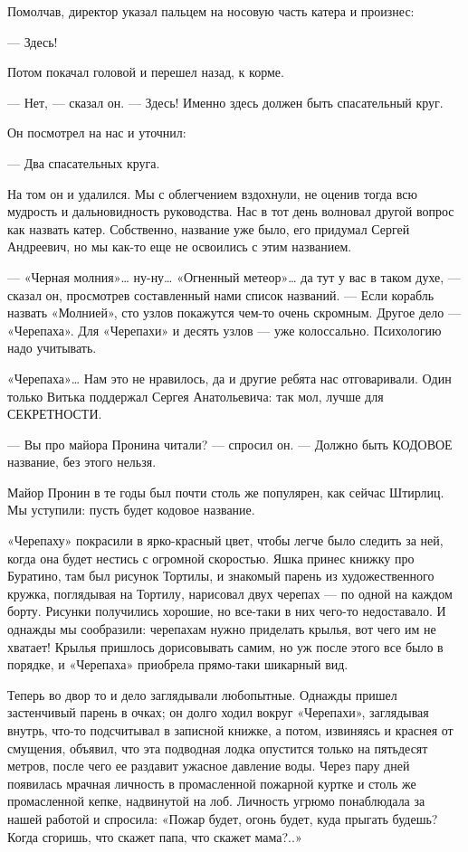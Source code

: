 Помолчав, директор указал пальцем на носовую часть катера и произнес:

— Здесь!

Потом покачал головой и перешел назад, к корме.

— Нет, — сказал он. — Здесь! Именно здесь должен быть спасательный круг.

Он посмотрел на нас и уточнил:

— Два спасательных круга.

На том он  и удалился.  Мы с облегчением  вздохнули, не  оценив тогда  всю
мудрость и  дальновидность руководства.  Нас в  тот день  волновал  другой
вопрос как  назвать катер.  Собственно, название  уже было,  его  придумал
Сергей Андреевич, но мы как-то еще не освоились с этим названием.

— «Черная молния»… ну-ну… «Огненный метеор»… да тут у вас в таком духе,  —
сказал он, просмотрев  составленный нами список  названий. — Если  корабль
назвать «Молнией», сто узлов покажутся чем-то очень скромным. Другое  дело
— «Черепаха». Для «Черепахи» и  десять узлов — уже колоссально.  Психологию
надо учитывать.

«Черепаха»… Нам это  не нравилось,  да и другие  ребята нас  отговаривали.
Один только  Витька  поддержал  Сергея Анатольевича:  так  мол,  лучше  для
СЕКРЕТНОСТИ.

— Вы  про майора  Пронина читали?  —  спросил он.  — Должно  быть  КОДОВОЕ
название, без этого нельзя.

Майор Пронин в те годы был  почти столь же популярен, как сейчас  Штирлиц.
Мы уступили: пусть будет кодовое название.

«Черепаху» покрасили в ярко-красный цвет, чтобы легче было следить за ней,
когда она  будет нестись  с  огромной скоростью.  Яшка принес  книжку  про
Буратино, там был  рисунок Тортилы, и  знакомый парень из  художественного
кружка, поглядывая на Тортилу, нарисовал двух черепах — по одной на каждом
борту. Рисунки получились хорошие, но все-таки в них чего-то  недоставало.
И однажды мы сообразили: черепахам нужно приделать крылья, вот чего им  не
хватает! Крылья пришлось дорисовывать самим, но уж после этого все было  в
порядке, и «Черепаха» приобрела прямо-таки шикарный вид.

Теперь  во  двор  то  и   дело  заглядывали  любопытные.  Однажды   пришел
застенчивый парень в очках; он  долго ходил вокруг «Черепахи»,  заглядывая
внутрь, что-то подсчитывал в записной книжке, а потом, извиняясь и краснея
от  смущения,  объявил,  что  эта  подводная  лодка  опустится  только  на
пятьдесят метров, после чего ее раздавит ужасное давление воды. Через пару
дней появилась мрачная личность в промасленной пожарной куртке и столь  же
промасленной кепке,  надвинутой на  лоб.  Личность угрюмо  понаблюдала  за
нашей работой и спросила: «Пожар будет, огонь будет, куда прыгать  будешь?
Когда сгоришь, что скажет папа, что скажет мама?..»

